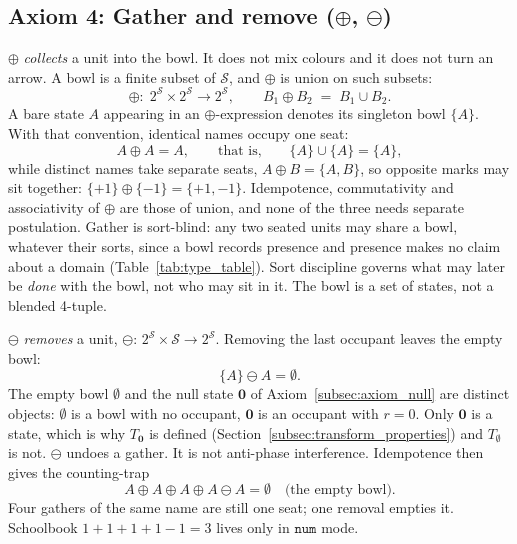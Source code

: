 \documentclass[12pt, a4paper]{article}
\begin{document}
\subsection{Axiom 4: Gather and remove ($\oplus$, $\ominus$)}
\label{subsec:axiom_idempotence}
$\oplus$ \emph{collects} a unit into the bowl. It does not mix colours
and it does not turn an arrow. A bowl is a finite subset of
$\mathcal{S}$, and $\oplus$ is union on such subsets:
\[
\oplus:\; 2^{\mathcal{S}}\times 2^{\mathcal{S}}
\longrightarrow 2^{\mathcal{S}},
\qquad
B_1 \oplus B_2 \;=\; B_1 \cup B_2 .
\]
A bare state $A$ appearing in an $\oplus$-expression denotes its
singleton bowl $\{A\}$. With that convention, identical names occupy
one seat:
\begin{equation}
    A \oplus A = A,
    \qquad\text{that is,}\qquad
    \{A\}\cup\{A\}=\{A\},
    \label{eq:idempotence_formal}
\end{equation}
while distinct names take separate seats, $A\oplus B=\{A,B\}$, so
opposite marks may sit together:
$\{+1\}\oplus\{-1\}=\{+1,-1\}$.
Idempotence, commutativity and associativity of $\oplus$ are those of
union, and none of the three needs separate postulation.
Gather is sort-blind: any two seated units may share a bowl, whatever
their sorts, since a bowl records presence and presence makes no claim
about a domain (Table~\ref{tab:type_table}). Sort discipline governs
what may later be \emph{done} with the bowl, not who may sit in it.
The bowl is a set of states, not a blended 4-tuple.

$\ominus$ \emph{removes} a unit,
$\ominus:\,2^{\mathcal{S}}\times\mathcal{S}\to 2^{\mathcal{S}}$.
Removing the last occupant leaves the empty bowl:
\begin{equation}
    \{A\}\ominus A = \emptyset.
    \label{eq:ominus_empty}
\end{equation}
The empty bowl $\emptyset$ and the null state $\mathbf{0}$ of
Axiom~\ref{subsec:axiom_null} are distinct objects: $\emptyset$ is a
bowl with no occupant, $\mathbf{0}$ is an occupant with $r=0$. Only
$\mathbf{0}$ is a state, which is why $T_{\mathbf{0}}$ is defined
(Section~\ref{subsec:transform_properties}) and $T_{\emptyset}$ is
not.
$\ominus$ undoes a gather. It is not anti-phase interference.
Idempotence then gives the counting-trap
\begin{equation}
    A \oplus A \oplus A \oplus A \ominus A = \emptyset
    \quad\text{(the empty bowl)}.
    \label{eq:four_a_ominus}
\end{equation}
Four gathers of the same name are still one seat; one removal empties
it. Schoolbook $1+1+1+1-1=3$ lives only in $\mathtt{num}$ mode.
\end{document}
